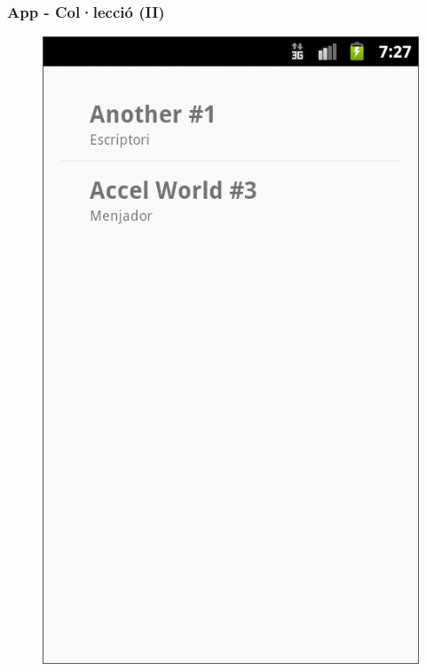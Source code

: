 \documentclass{beamer}
\begin{document}
	\begin{frame}
	\frametitle{App - Col·lecció (II)}
		\begin{figure}
			\centering
			\includegraphics[scale=0.23]{to_read.png}\hspace*{3ex}

\end{figure}
\end{frame}
\end{document}
